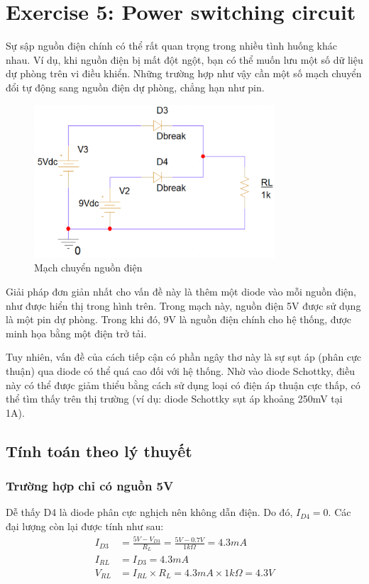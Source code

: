 \section{Exercise 5: Power switching circuit}

Sự sập nguồn điện chính có thể rất quan trọng trong nhiều tình huống khác nhau. Ví dụ, khi nguồn điện bị mất đột ngột, bạn có thể muốn lưu một số dữ liệu dự phòng trên vi điều khiển. Những trường hợp như vậy cần một số mạch chuyển đổi tự động sang nguồn điện dự phòng, chẳng hạn như pin.

\begin{figure}[H]
    \centering
    \includegraphics[width=0.8\textwidth]{graphics/ex5/f1.png}
    \caption{Mạch chuyển nguồn điện}
\end{figure}
Giải pháp đơn giản nhất cho vấn đề này là thêm một diode vào mỗi nguồn điện, như được hiển thị trong hình trên. Trong mạch này, nguồn điện 5V được sử dụng là một pin dự phòng. Trong khi đó, 9V là nguồn điện chính cho hệ thống, được minh họa bằng một điện trở tải.


Tuy nhiên, vấn đề của cách tiếp cận có phần ngây thơ này là sự sụt áp (phân cực thuận) qua diode có thể quá cao đối với hệ thống. Nhờ vào diode Schottky, điều này có thể được giảm thiểu bằng cách sử dụng loại có điện áp thuận cực thấp, có thể tìm thấy trên thị trường (ví dụ: diode Schottky sụt áp khoảng 250mV tại 1A).

\subsection{Tính toán theo lý thuyết}
\subsubsection{Trường hợp chỉ có nguồn 5V}
Dễ thấy D4 là diode phân cực nghịch nên không dẫn điện. Do đó, \(I_{D4} = 0\). Các đại lượng còn lại được tính như sau:
\begin{align*}
I_{D3} &= \frac{5V - V_{D3}}{R_{L}} = \frac{5V - 0.7V}{1k\Omega} = 4.3mA  \\
I_{RL} &= I_{D3} = 4.3mA \\
V_{RL} &= I_{RL} \times R_{L} = 4.3mA \times 1k\Omega = 4.3V
\end{align*}

